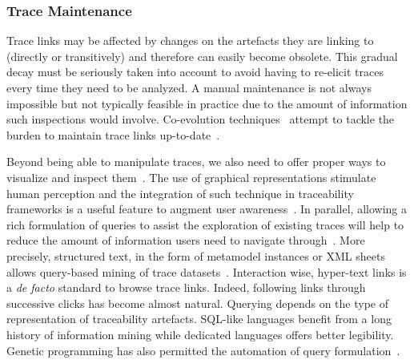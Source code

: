 \subsubsection{Trace Maintenance} 
Trace links may be affected by changes on the artefacts they are linking to (directly or transitively) and therefore can easily become obsolete. This gradual decay must be seriously taken into account to avoid having to re-elicit traces every time they need to be analyzed. A manual maintenance is not always impossible but not typically feasible in practice due to the amount of information such inspections would involve. %
Co-evolution techniques~\cite{mader2008-rule-based-maintenance-post-requirements-traceability,drivalos2010-state-based-traceability,rahimi2019-Evolving-trace-req2source} attempt to tackle the burden to maintain trace links up-to-date~\cite{seibel2010-dynamic-hierarchical-models-comprehensive-traceability,Bunder_2017_query-for-quality}. 

Beyond being able to manipulate traces, we also need to offer proper ways to visualize and inspect them~\cite{fittkau2013-explorviz-Trace-Visualization}. The use of graphical representations stimulate human perception and the integration of such technique in traceability frameworks is a useful feature to augment user awareness~\cite{heisig2019-generic-traceability-metamodel-end-to-end-capra}.
In parallel, allowing a rich formulation of queries to assist the exploration of existing traces will help to reduce the amount of information users need to navigate through~\cite{Bunder_2017_query-for-quality}.
More precisely, structured text, in the form of metamodel instances or XML sheets allows query-based mining of trace datasets~\cite{dietrich2013-learning-efective-query-transformation-for-enhanced-req-trace-retrieval}. Interaction wise, hyper-text links is a \textit{de facto} standard to browse trace links. Indeed, following links through successive clicks has become almost natural.  Querying depends on the type of representation of traceability artefacts. SQL-like languages benefit from a long history of information mining while dedicated languages offers better legibility. Genetic programming has also permitted the automation of query formulation~\cite{perez2020-genetic-query-reformulation-for-feature-location}. 

